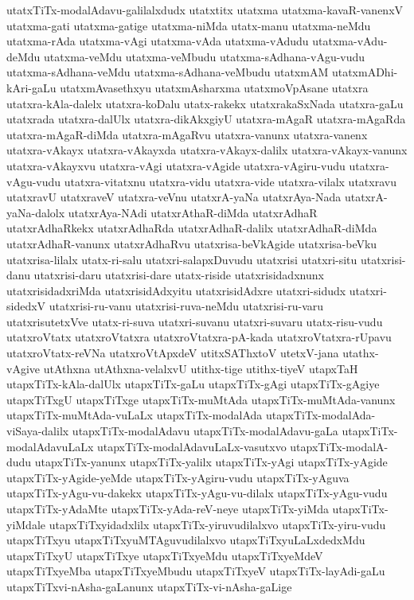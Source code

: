{utatxTiTx-modalAdavu-galilalxdudx
utatxtitx
utatxma
utatxma-kavaR-vanenxV
utatxma-gati
utatxma-gatige
utatxma-niMda
utatx-manu
utatxma-neMdu
utatxma-rAda
utatxma-vAgi
utatxma-vAda
utatxma-vAdudu
utatxma-vAdu-deMdu
utatxma-veMdu
utatxma-veMbudu
utatxma-sAdhana-vAgu-vudu
utatxma-sAdhana-veMdu
utatxma-sAdhana-veMbudu
utatxmAM
utatxmADhi-kAri-gaLu
utatxmAvasethxyu
utatxmAsharxma
utatxmoVpAsane
utatxra
utatxra-kAla-dalelx
utatxra-koDalu
utatx-rakekx
utatxrakaSxNada
utatxra-gaLu
utatxrada
utatxra-dalUlx
utatxra-dikAkxgiyU
utatxra-mAgaR
utatxra-mAgaRda
utatxra-mAgaR-diMda
utatxra-mAgaRvu
utatxra-vanunx
utatxra-vanenx
utatxra-vAkayx
utatxra-vAkayxda
utatxra-vAkayx-dalilx
utatxra-vAkayx-vanunx
utatxra-vAkayxvu
utatxra-vAgi
utatxra-vAgide
utatxra-vAgiru-vudu
utatxra-vAgu-vudu
utatxra-vitatxnu
utatxra-vidu
utatxra-vide
utatxra-vilalx
utatxravu
utatxravU
utatxraveV
utatxra-veVnu
utatxrA-yaNa
utatxrAya-Nada
utatxrA-yaNa-dalolx
utatxrAya-NAdi
utatxrAthaR-diMda
utatxrAdhaR
utatxrAdhaRkekx
utatxrAdhaRda
utatxrAdhaR-dalilx
utatxrAdhaR-diMda
utatxrAdhaR-vanunx
utatxrAdhaRvu
utatxrisa-beVkAgide
utatxrisa-beVku
utatxrisa-lilalx
utatx-ri-salu
utatxri-salapxDuvudu
utatxrisi
utatxri-situ
utatxrisi-danu
utatxrisi-daru
utatxrisi-dare
utatx-riside
utatxrisidadxnunx
utatxrisidadxriMda
utatxrisidAdxyitu
utatxrisidAdxre
utatxri-sidudx
utatxri-sidedxV
utatxrisi-ru-vanu
utatxrisi-ruva-neMdu
utatxrisi-ru-varu
utatxrisutetxVve
utatx-ri-suva
utatxri-suvanu
utatxri-suvaru
utatx-risu-vudu
utatxroVtatx
utatxroVtatxra
utatxroVtatxra-pA-kada
utatxroVtatxra-rUpavu
utatxroVtatx-reVNa
utatxroVtApxdeV
utitxSAThxtoV
utetxV-jana
utathx-vAgive
utAthxna
utAthxna-velalxvU
utithx-tige
utithx-tiyeV
utapxTaH
utapxTiTx-kAla-dalUlx
utapxTiTx-gaLu
utapxTiTx-gAgi
utapxTiTx-gAgiye
utapxTiTxgU
utapxTiTxge
utapxTiTx-muMtAda
utapxTiTx-muMtAda-vanunx
utapxTiTx-muMtAda-vuLaLx
utapxTiTx-modalAda
utapxTiTx-modalAda-viSaya-dalilx
utapxTiTx-modalAdavu
utapxTiTx-modalAdavu-gaLa
utapxTiTx-modalAdavuLaLx
utapxTiTx-modalAdavuLaLx-vasutxvo
utapxTiTx-modalA-dudu
utapxTiTx-yanunx
utapxTiTx-yalilx
utapxTiTx-yAgi
utapxTiTx-yAgide
utapxTiTx-yAgide-yeMde
utapxTiTx-yAgiru-vudu
utapxTiTx-yAguva
utapxTiTx-yAgu-vu-dakekx
utapxTiTx-yAgu-vu-dilalx
utapxTiTx-yAgu-vudu
utapxTiTx-yAdaMte
utapxTiTx-yAda-reV-neye
utapxTiTx-yiMda
utapxTiTx-yiMdale
utapxTiTxyidadxlilx
utapxTiTx-yiruvudilalxvo
utapxTiTx-yiru-vudu
utapxTiTxyu
utapxTiTxyuMTAguvudilalxvo
utapxTiTxyuLaLxdedxMdu
utapxTiTxyU
utapxTiTxye
utapxTiTxyeMdu
utapxTiTxyeMdeV
utapxTiTxyeMba
utapxTiTxyeMbudu
utapxTiTxyeV
utapxTiTx-layAdi-gaLu
utapxTiTxvi-nAsha-gaLanunx
utapxTiTx-vi-nAsha-gaLige
}

